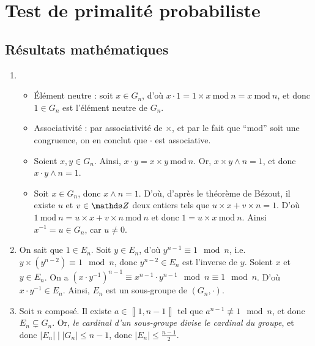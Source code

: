 \section{Test de primalité probabiliste}
\subsection{Résultats mathématiques}

\begin{enumerate}
	\item
		\begin{itemize}
			\item Élément neutre : soit $x \in G_n$, d'où $x \cdot 1 = 1 \times x\ \mathrm{mod}\ n = x\ \mathrm{mod}\ n$, et donc $1 \in G_n$\/ est l'élément neutre de $G_n$.
			\item Associativité : par associativité de $\times$, et par le fait que ``$\mathrm{mod}$'' soit une congruence, on en conclut que $\cdot$\/ est associative.
			\item Soient $x,y \in G_n$. Ainsi, $x \cdot y = x \times y \ \mathrm{mod}\ n$. Or, $x \times y \wedge n = 1$, et donc $x\cdot y \wedge n = 1$.
			\item Soit $x \in G_n$, donc $x \wedge n = 1$. D'où, d'après le théorème de {\sc Bézout}, il existe $u$\/ et $v \in \Z$\/ deux entiers tels que $u\times x + v\times n = 1$. D'où $1\ \mathrm{mod}\ n = u \times x + v \times n\ \mathrm{mod}\ n$\/ et donc $1 = u \times x\ \mathrm{mod}\ n$. Ainsi $x^{-1} = u \in G_n$, car $u \neq 0$.
		\end{itemize}

	\item On sait que $1 \in E_n$. Soit $y \in E_n$, d'où $y^{n-1} \equiv 1\mod n$, i.e.\ $y\times (y^{n-2}) \equiv 1\mod n$, donc $y^{n-2} \in E_n$\/ est l'inverse de $y$. Soient $x$\/ et $y \in E_n$. On a $(x\cdot y^{-1})^{n-1} \equiv x^{n-1} \cdot y^{n-1}\mod n \equiv 1 \mod n$. D'où $x \cdot y^{-1} \in E_n$. Ainsi, $E_n$\/ est un sous-groupe de $(G_n, \cdot)$.

	\item Soit $n$\/ composé. Il existe $a \in \left\llbracket 1,n-1 \right\rrbracket$\/ tel que $a^{n-1} \not\equiv 1 \mod n$, et donc $E_n \subsetneq G_n$.
		Or, {\slshape le cardinal d'un sous-groupe divise le cardinal du groupe}, et donc $|E_n|  \mid |G_n| \le n-1$, donc $|E_n| \le \frac{n-1}{2}$.


\end{enumerate}
